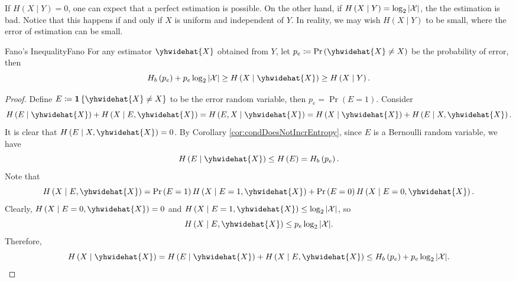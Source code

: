\documentclass[math, code]{amznotes}
\theoremstyle{remark}
\begin{document}
If $H\left(X \mid Y\right) = 0$, one can expect that a perfect estimation is possible. On the other hand, if $H\left(X \mid Y\right) = \log_2{\left\lvert {\mathcal{X}} \right\rvert}$, the the estimation is bad. Notice that this happens if and only if $X$ is uniform and independent of $Y$. In reality, we may wish $H\left(X \mid Y\right)$ to be small, where the error of estimation can be small.
\begin{thmbox}{Fano's Inequality}{Fano}
    For any estimator $\yhwidehat{X}$ obtained from $Y$, let $p_e \coloneqq \Pr\left(\yhwidehat{X} \neq X\right)$ be the probability of error, then 
    \begin{equation*}
        H_b\left(p_e\right) + p_e\log_2\abs{\mathcal{X}} \geq H\left(X \mid \yhwidehat{X}\right) \geq H\left(X \mid Y\right).
    \end{equation*}
    \tcblower
    \begin{proof}
        Define $E \coloneqq \mathbf{1}\left\{\yhwidehat{X} \neq X\right\}$ to be the error random variable, then $p_e = \Pr\left(E = 1\right)$. Consider 
        \begin{equation*}
            H\left(E \mid \yhwidehat{X}\right) + H\left(X \mid E, \yhwidehat{X}\right) = H\left(E, X \mid \yhwidehat{X}\right) = H\left(X \mid \yhwidehat{X}\right) + H\left(E \mid X, \yhwidehat{X}\right).
        \end{equation*}
        It is clear that $H\left(E \mid X, \yhwidehat{X}\right) = 0$. By Corollary \ref{cor:condDoesNotIncrEntropy}, since $E$ is a Bernoulli random variable, we have 
        \begin{equation*}
            H\left(E \mid \yhwidehat{X}\right) \leq H\left(E\right) = H_b\left(p_e\right).
        \end{equation*}
        Note that 
        \begin{equation*}
            H\left(X \mid E, \yhwidehat{X}\right) = \Pr\left(E = 1\right)H\left(X \mid E = 1, \yhwidehat{X}\right) + \Pr\left(E = 0\right)H\left(X \mid E = 0, \yhwidehat{X}\right).
        \end{equation*}
        Clearly, $H\left(X \mid E = 0, \yhwidehat{X}\right) = 0$ and $H\left(X \mid E = 1, \yhwidehat{X}\right) \leq \log_2\abs{\mathcal{X}}$, so 
        \begin{equation*}
            H\left(X \mid E, \yhwidehat{X}\right) \leq p_e\log_2\abs{\mathcal{X}}.
        \end{equation*}
        Therefore, 
        \begin{equation*}
            H\left(X \mid \yhwidehat{X}\right) = H\left(E \mid \yhwidehat{X}\right) + H\left(X \mid E, \yhwidehat{X}\right) \leq H_b\left(p_e\right) + p_e\log_2\abs{\mathcal{X}}.

\end{equation*}
\end{proof}
\end{thmbox}
\end{document}
